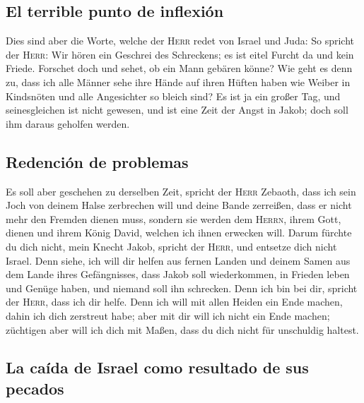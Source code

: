 \hypertarget{el-terrible-punto-de-inflexiuxf3n}{%
\subsection{El terrible punto de
inflexión}\label{el-terrible-punto-de-inflexiuxf3n}}

 Dies sind aber die Worte, welche der \textsc{Herr} redet
von Israel und Juda:  So spricht der \textsc{Herr}: Wir
hören ein Geschrei des Schreckens; es ist eitel Furcht da und kein
Friede.  Forschet doch und sehet, ob ein Mann gebären
könne? Wie geht es denn zu, dass ich alle Männer sehe ihre Hände auf
ihren Hüften haben wie Weiber in Kindsnöten und alle Angesichter so
bleich sind?  Es ist ja ein großer Tag, und seinesgleichen
ist nicht gewesen, und ist eine Zeit der Angst in Jakob; doch soll ihm
daraus geholfen werden.

\hypertarget{redenciuxf3n-de-problemas}{%
\subsection{Redención de problemas}\label{redenciuxf3n-de-problemas}}

 Es soll aber geschehen zu derselben Zeit, spricht der
\textsc{Herr} Zebaoth, dass ich sein Joch von deinem Halse zerbrechen
will und deine Bande zerreißen, dass er nicht mehr den Fremden dienen
muss,  sondern sie werden dem \textsc{Herrn}, ihrem Gott,
dienen und ihrem König David, welchen ich ihnen erwecken will.
 Darum fürchte du dich nicht, mein Knecht Jakob, spricht
der \textsc{Herr}, und entsetze dich nicht Israel. Denn siehe, ich will
dir helfen aus fernen Landen und deinem Samen aus dem Lande ihres
Gefängnisses, dass Jakob soll wiederkommen, in Frieden leben und Genüge
haben, und niemand soll ihn schrecken.  Denn ich bin bei
dir, spricht der \textsc{Herr}, dass ich dir helfe. Denn ich will mit
allen Heiden ein Ende machen, dahin ich dich zerstreut habe; aber mit
dir will ich nicht ein Ende machen; züchtigen aber will ich dich mit
Maßen, dass du dich nicht für unschuldig haltest.

\hypertarget{la-cauxedda-de-israel-como-resultado-de-sus-pecados}{%
\subsection{La caída de Israel como resultado de sus
pecados}\label{la-cauxedda-de-israel-como-resultado-de-sus-pecados}}

